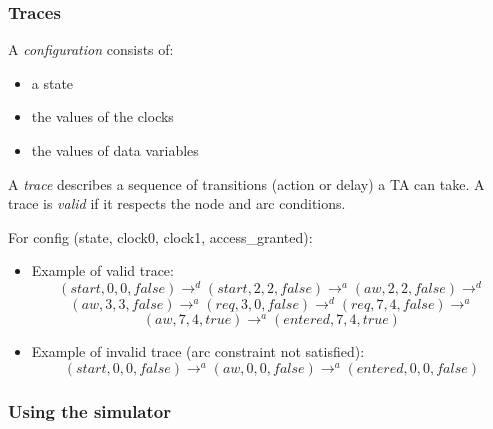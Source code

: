\documentclass{beamer}
\begin{document}
\begin{frame}[fragile]\frametitle{Traces}

  A \emph{configuration} consists of:
  \begin{itemize}
  \item a state 
  \item the values of the clocks
  \item the values of data variables
  \end{itemize}

  A \emph{trace} describes a sequence of transitions (action or delay) a TA can
  take. A trace is \emph{valid} if it respects the node and arc conditions.

  \vspace{3mm}
  For config (state, clock0, clock1, access\_granted):
  \begin{itemize}
  \item Example of valid trace:
  \[(start, 0, 0, false) \to^d (start, 2, 2, false) \to^a (aw, 2, 2, false) \to^d \]
  \[(aw, 3, 3, false) \to^a (req, 3, 0, false) \to^d (req, 7, 4, false) \to^a \]
  \[(aw, 7, 4, true) \to^a (entered, 7, 4, true) \]
  \item Example of invalid trace (arc constraint not satisfied):
  \[(start, 0, 0, false)  \to^a (aw, 0, 0, false) \to^a (entered, 0, 0, false)\]
  \end{itemize}
\end{frame}


\begin{frame}[fragile]\frametitle{Using the simulator}
  
\end{frame}
\end{document}

